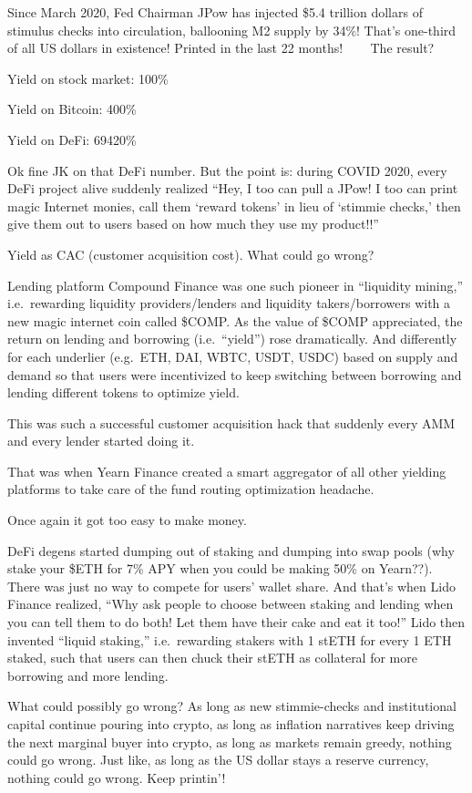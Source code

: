 \documentclass[
]{book}
\begin{document}
Since March 2020, Fed Chairman JPow has injected \$5.4 trillion dollars of stimulus checks into circulation, ballooning M2 supply by 34\%! That's one-third of all US dollars in existence! Printed in the last 22 months! 🤯 🤯 🤯 The result?

Yield on stock market: 100\%

Yield on Bitcoin: 400\%

Yield on DeFi: 69420\%

Ok fine JK on that DeFi number. But the point is: during COVID 2020, every DeFi project alive suddenly realized ``Hey, I too can pull a JPow! I too can print magic Internet monies, call them `reward tokens' in lieu of `stimmie checks,' then give them out to users based on how much they use my product!!''

Yield as CAC (customer acquisition cost). What could go wrong?

Lending platform Compound Finance was one such pioneer in ``liquidity mining,'' i.e.~rewarding liquidity providers/lenders and liquidity takers/borrowers with a new magic internet coin called \$COMP. As the value of \$COMP appreciated, the return on lending and borrowing (i.e.~``yield'') rose dramatically. And differently for each underlier (e.g.~ETH, DAI, WBTC, USDT, USDC) based on supply and demand so that users were incentivized to keep switching between borrowing and lending different tokens to optimize yield.

This was such a successful customer acquisition hack that suddenly every AMM and every lender started doing it.

That was when Yearn Finance created a smart aggregator of all other yielding platforms to take care of the fund routing optimization headache.

Once again it got too easy to make money.

DeFi degens started dumping out of staking and dumping into swap pools (why stake your \$ETH for 7\% APY when you could be making 50\% on Yearn??). There was just no way to compete for users' wallet share. And that's when Lido Finance realized, ``Why ask people to choose between staking and lending when you can tell them to do both! Let them have their cake and eat it too!'' Lido then invented ``liquid staking,'' i.e.~rewarding stakers with 1 stETH for every 1 ETH staked, such that users can then chuck their stETH as collateral for more borrowing and more lending.

What could possibly go wrong? As long as new stimmie-checks and institutional capital continue pouring into crypto, as long as inflation narratives keep driving the next marginal buyer into crypto, as long as markets remain greedy, nothing could go wrong. Just like, as long as the US dollar stays a reserve currency, nothing could go wrong. Keep printin'!
\end{document}

